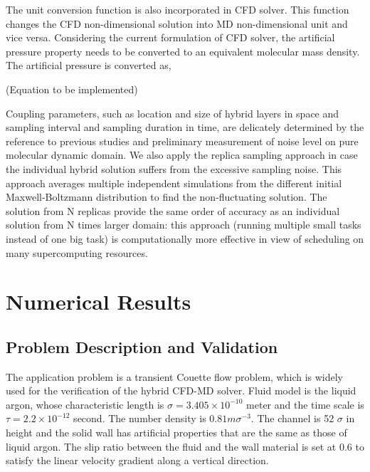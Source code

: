 \documentclass[]{aiaa-tc}%
\begin{document}
The unit conversion function is also incorporated in CFD solver. This function changes
the CFD non-dimensional solution into MD non-dimensional unit and vice versa. 
Considering the current formulation of CFD solver, the artificial pressure property
needs to be converted to an equivalent molecular mass density. The artificial pressure
is converted as,

(Equation to be implemented)

Coupling parameters, such as location and size of hybrid layers in space and 
sampling interval and sampling duration in time, are delicately determined 
by the reference to previous studies\cite{Nie,Yen,Liu,Hadjicon2,Werder,Flekkoy,Delgado1}
and preliminary measurement of noise level on pure molecular dynamic domain.
We also apply the replica sampling approach\cite{REMD} in case the individual 
hybrid solution suffers from the excessive sampling noise. This approach averages 
multiple independent simulations from the different initial Maxwell-Boltzmann 
distribution to find the non-fluctuating solution. The solution from N replicas 
provide the same order of accuracy as an individual solution from N times larger 
domain: this approach (running multiple small tasks instead of one big task) is 
computationally more effective in view of scheduling on many supercomputing
resources.


\section{Numerical Results}
\label{sec:result}

\subsection{Problem Description and Validation}
\label{sec:result_val}

The application problem is a transient Couette flow problem, which is widely used
for the verification of the hybrid CFD-MD solver. Fluid model is the liquid argon, whose
characteristic length is ${\sigma}=3.405{\times}10^{-10}$ meter and the time scale is 
$\tau=2.2{\times}10^{-12}$ second. The number density is $0.81m{\sigma}^{-3}$.
The channel is 52 $\sigma$ in height and the solid wall has artificial properties 
that are the same as those of liquid argon. The slip ratio between the fluid and the wall
material is set at 0.6 to satisfy the linear velocity gradient along a vertical 
direction.~\cite{Nie}
\end{document}
